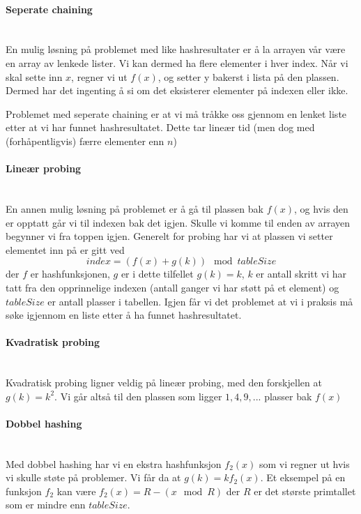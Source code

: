 \paragraph{Seperate chaining}~\\
En mulig løsning på problemet med like hashresultater er å la arrayen vår være en array av lenkede lister. Vi kan dermed ha flere elementer i hver index. Når vi skal sette inn $ x $, regner vi ut $ f(x) $, og setter y bakerst i lista på den plassen. Dermed har det ingenting å si om det eksisterer elementer på indexen eller ikke. 

Problemet med seperate chaining er at vi må tråkke oss gjennom en lenket liste etter at vi har funnet hashresultatet. Dette tar lineær tid (men dog med (forhåpentligvis) færre elementer enn $ n $)


\paragraph{Lineær probing}~\\
En annen mulig løsning på problemet er å gå til plassen bak $ f(x) $, og hvis den er opptatt går vi til indexen bak det igjen. Skulle vi komme til enden av arrayen begynner vi fra toppen igjen. Generelt for probing har vi at plassen vi setter elementet inn på er gitt ved
\[ index = (f(x) + g(k)) \mod{tableSize} \]
der $ f $ er hashfunksjonen, $ g $ er i dette tilfellet $ g(k) = k $, $ k $ er antall skritt vi har tatt fra den opprinnelige indexen (antall ganger vi har støtt på et element) og $ tableSize $ er antall plasser i tabellen. Igjen får vi det problemet at vi i praksis må søke igjennom en liste etter å ha funnet hashresultatet. 

\paragraph{Kvadratisk probing}~\\
Kvadratisk probing ligner veldig på lineær probing, med den forskjellen at $ g(k) = k^2 $. Vi går altså til den plassen som ligger $ 1, 4, 9, ... $ plasser bak $ f(x) $

\paragraph{Dobbel hashing}~\\
Med dobbel hashing har vi en ekstra hashfunksjon $ f_2(x) $ som vi regner ut hvis vi skulle støte på problemer. Vi får da at $ g(k) = k f_2(x) $. Et eksempel på en funksjon $ f_2 $ kan være $ f_2(x) = R-(x \mod R) $ der $ R $ er det største primtallet som er mindre enn $ tableSize $. 


